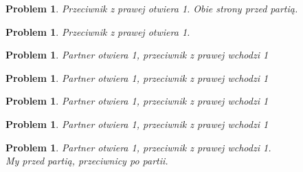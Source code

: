 \documentclass[12pt, a4paper]{article}
\newtheorem{problem}[table]{Problem}
\begin{document}
\begin{problem}
    Przeciwnik z prawej otwiera \emph{1\diams}. Obie strony przed partią.
\end{problem}
\begin{center}
\end{center}

\begin{problem}
    Przeciwnik z prawej otwiera \emph{1\diams}.
\end{problem}
\begin{center}
\end{center}

\begin{problem}
    Partner otwiera \emph{1\hearts}, przeciwnik z prawej wchodzi \emph{1\spades}
\end{problem}
\begin{center}
\end{center}

\begin{problem}
    Partner otwiera \emph{1\hearts}, przeciwnik z prawej wchodzi \emph{1\spades}
\end{problem}
\begin{center}
\end{center}



\pagebreak

\begin{problem}
    Partner otwiera \emph{1\clubs}, przeciwnik z prawej wchodzi \emph{1\spades}
\end{problem}
\begin{center}
\end{center}

\begin{problem}
    Partner otwiera \emph{1\clubs}, przeciwnik z prawej wchodzi \emph{1\spades}
\end{problem}
\begin{center}
\end{center}

\begin{problem}
    Partner otwiera \emph{1\clubs}, przeciwnik z prawej wchodzi \emph{1\spades}. \\
    My przed partią, przeciwnicy po partii.
\end{problem}
\begin{center}
\end{center}
\end{document}
